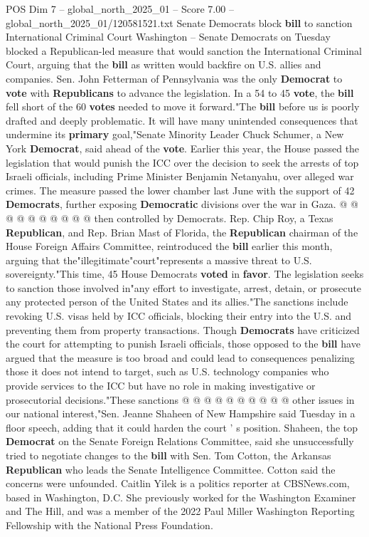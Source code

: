 \begin{textsample}{POS Dim 7 – global\_north\_2025\_01 – Score 7.00 – global\_north\_2025\_01/120581521.txt}  \label{ex:f7_pos_270}
Senate Democrats block \textbf{bill} to sanction International Criminal Court Washington -- Senate Democrats on Tuesday blocked a Republican-led measure that would sanction the International Criminal Court, arguing that the \textbf{bill} as written would backfire on U.S. allies and companies.
Sen.
John Fetterman of Pennsylvania was the only \textbf{Democrat} to \textbf{vote} with \textbf{Republicans} to advance the legislation.
In a 54 to 45 \textbf{vote}, the \textbf{bill} fell short of the 60 \textbf{votes} needed to move it forward."The \textbf{bill} before us is poorly drafted and deeply problematic.
It will have many unintended consequences that undermine its \textbf{primary} goal,"Senate Minority Leader Chuck Schumer, a New York \textbf{Democrat}, said ahead of the \textbf{vote}.
Earlier this year, the House passed the legislation that would punish the ICC over the decision to seek the arrests of top Israeli officials, including Prime Minister Benjamin Netanyahu, over alleged war crimes.
The measure passed the lower chamber last June with the support of 42 \textbf{Democrats}, further exposing \textbf{Democratic} divisions over the war in Gaza. @ @ @ @ @ @ @ @ @ @ then controlled by Democrats.
Rep.
Chip Roy, a Texas \textbf{Republican}, and Rep.
Brian Mast of Florida, the \textbf{Republican} chairman of the House Foreign Affairs Committee, reintroduced the \textbf{bill} earlier this month, arguing that the"illegitimate"court"represents a massive threat to U.S. sovereignty."This time, 45 House Democrats \textbf{voted} in \textbf{favor}.
The legislation seeks to sanction those involved in"any effort to investigate, arrest, detain, or prosecute any protected person of the United States and its allies."The sanctions include revoking U.S. visas held by ICC officials, blocking their entry into the U.S. and preventing them from property transactions.
Though \textbf{Democrats} have criticized the court for attempting to punish Israeli officials, those opposed to the \textbf{bill} have argued that the measure is too broad and could lead to consequences penalizing those it does not intend to target, such as U.S. technology companies who provide services to the ICC but have no role in making investigative or prosecutorial decisions."These sanctions @ @ @ @ @ @ @ @ @ @ other issues in our national interest,"Sen.
Jeanne Shaheen of New Hampshire said Tuesday in a floor speech, adding that it could harden the court ' s position.
Shaheen, the top \textbf{Democrat} on the Senate Foreign Relations Committee, said she unsuccessfully tried to negotiate changes to the \textbf{bill} with Sen.
Tom Cotton, the Arkansas \textbf{Republican} who leads the Senate Intelligence Committee.
Cotton said the concerns were unfounded.
Caitlin Yilek is a politics reporter at CBSNews.com, based in Washington, D.C.
She previously worked for the Washington Examiner and The Hill, and was a member of the 2022 Paul Miller Washington Reporting Fellowship with the National Press Foundation.

\end{textsample}
